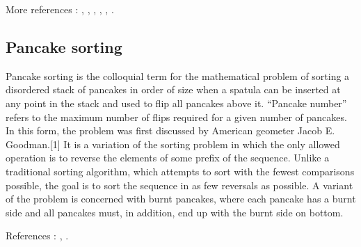 More references : \cite{kahnkim1}, \cite{dietzfelbinger1989lower}, \cite{steiger1995pseudo}, \cite{lambert1990sorting}, \cite{erickson1997lower}, \cite{bremner2012necklaces}.







\subsection{Pancake sorting}


Pancake sorting is the colloquial term for the mathematical problem of sorting a disordered stack of pancakes in order of size when a spatula can be inserted at any point in the stack and used to flip all pancakes above it. ``Pancake number'' refers to the maximum number of flips required for a given number of pancakes. In this form, the problem was first discussed by American geometer Jacob E. Goodman.[1] It is a variation of the sorting problem in which the only allowed operation is to reverse the elements of some prefix of the sequence. Unlike a traditional sorting algorithm, which attempts to sort with the fewest comparisons possible, the goal is to sort the sequence in as few reversals as possible. A variant of the problem is concerned with burnt pancakes, where each pancake has a burnt side and all pancakes must, in addition, end up with the burnt side on bottom.


References : \cite{cibulka2011average}, \cite{cohen1995problem}.